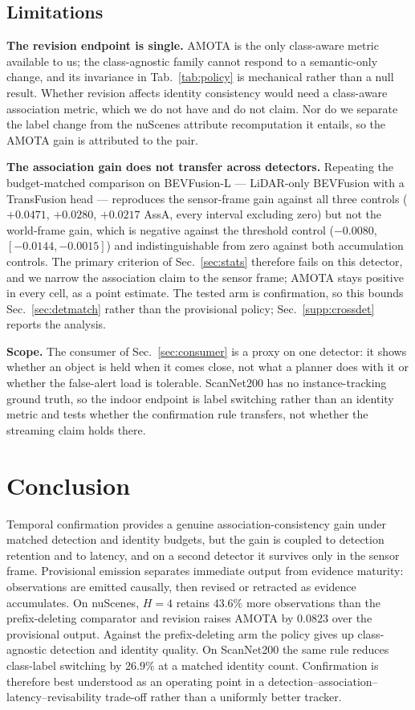 \subsection{Limitations}

\noindent\textbf{The revision endpoint is single.} AMOTA is the only
class-aware metric available to us; the class-agnostic family cannot respond
to a semantic-only change, and its invariance in Tab.~\ref{tab:policy} is
mechanical rather than a null result. Whether revision affects identity
consistency would need a class-aware association metric, which we do not have
and do not claim. Nor do we separate the label change from the nuScenes
attribute recomputation it entails, so the AMOTA gain is attributed to the
pair.

\noindent\textbf{The association gain does not transfer across detectors.}
Repeating the budget-matched comparison on BEVFusion-L --- LiDAR-only
BEVFusion with a TransFusion head --- reproduces the sensor-frame gain against
all three controls ($+0.0471$, $+0.0280$, $+0.0217$ AssA, every interval
excluding zero) but not the world-frame gain, which is negative against the
threshold control ($-0.0080$, $[{-}0.0144,{-}0.0015]$) and indistinguishable
from zero against both accumulation controls. The primary criterion of
Sec.~\ref{sec:stats} therefore fails on this detector, and we narrow the
association claim to the sensor frame; AMOTA stays positive in every cell, as
a point estimate. The tested arm is confirmation, so this bounds
Sec.~\ref{sec:detmatch} rather than the provisional policy;
Sec.~\ref{supp:crossdet} reports the analysis.

\noindent\textbf{Scope.} The consumer of Sec.~\ref{sec:consumer} is a proxy on
one detector: it shows whether an object is held when it comes close, not what
a planner does with it or whether the false-alert load is tolerable. ScanNet200 has no instance-tracking
ground truth, so the indoor endpoint is label switching rather than an identity
metric and tests whether the confirmation rule transfers, not whether the
streaming claim holds there.

\section{Conclusion}
\label{sec:conclusion}

Temporal confirmation provides a genuine association-consistency gain under
matched detection and identity budgets, but the gain is coupled to detection
retention and to latency, and on a second detector it survives only in the
sensor frame. Provisional emission separates immediate output from
evidence maturity: observations are emitted causally, then revised or retracted
as evidence accumulates. On nuScenes, $H{=}4$ retains $43.6\%$ more
observations than the prefix-deleting comparator and revision raises
AMOTA by $0.0823$ over the provisional output. Against the prefix-deleting arm
the policy gives up class-agnostic detection and identity quality. On
ScanNet200 the same rule reduces class-label switching by $26.9\%$ at a matched
identity count.
Confirmation is therefore best understood as an operating point in a
detection--association--latency--revisability trade-off rather than a
uniformly better tracker.

